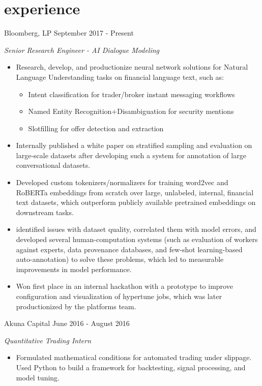 \documentclass[print]{friggeri-cv} %
\begin{document}
\section{experience}

\begin{entrylist}

\entry
{Bloomberg, LP}
{September 2017 - Present}
{\emph{Senior Research Engineer - AI Dialogue Modeling}
\begin{itemize}
\item Research, develop, and productionize neural network solutions for Natural Language Understanding tasks on financial language text, such as:
\begin{itemize}
\item Intent classification for trader/broker instant messaging workflows
\item Named Entity Recognition+Disambiguation for security mentions
\item Slotfilling for offer detection and extraction
\end{itemize}
\item Internally published a white paper on stratified sampling and evaluation on large-scale datasets after developing such a system for annotation of large conversational datasets.
\item Developed custom tokenizers/normalizers for training word2vec and RoBERTa embeddings from scratch over large, unlabeled, internal, financial text datasets, which outperform publicly available pretrained embeddings on downstream tasks.
\item identified issues with dataset quality, correlated them with model errors, and developed several human-computation systems (such as evaluation of workers against experts, data provenance databases, and few-shot learning-based auto-annotation) to solve these problems, which led to measurable improvements in model performance.
\item Won first place in an internal hackathon with a prototype to improve configuration and visualization of hypertune jobs, which was later productionized by the platforms team.
\end{itemize}}
\entry
{Akuna Capital}
{June 2016 - August 2016}
{\emph{Quantitative Trading Intern}
\begin{itemize}
\item Formulated mathematical conditions for automated trading under slippage. Used Python to build a framework for backtesting, signal processing, and model tuning. 

\end{itemize}}
\end{entrylist}
\end{document}
